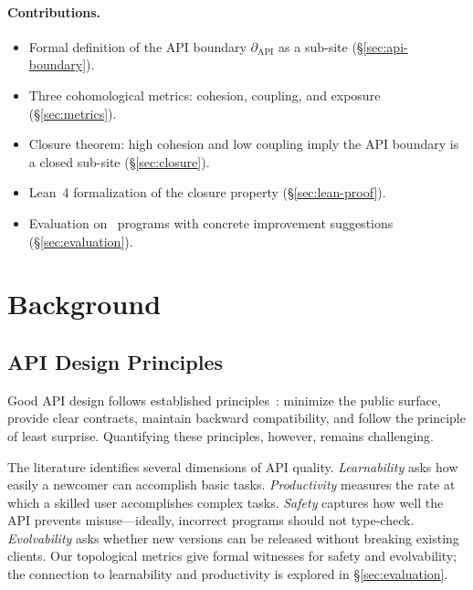 \documentclass[11pt]{article}
\newcommand{\APIBoundary}{\partial_{\mathrm{API}}}
\begin{document}
\paragraph{Contributions.}
\begin{itemize}[noitemsep]
  \item Formal definition of the API boundary $\APIBoundary$ as a sub-site
        (§\ref{sec:api-boundary}).
  \item Three cohomological metrics: cohesion, coupling, and exposure
        (§\ref{sec:metrics}).
  \item Closure theorem: high cohesion and low coupling imply the API
        boundary is a closed sub-site (§\ref{sec:closure}).
  \item Lean~4 formalization of the closure property
        (§\ref{sec:lean-proof}).
  \item Evaluation on \compTotalPrograms\ programs with concrete
        improvement suggestions (§\ref{sec:evaluation}).
\end{itemize}

\section{Background}\label{sec:background}

\subsection{API Design Principles}
Good API design follows established principles~\cite{Bloch2006}: minimize
the public surface, provide clear contracts, maintain backward
compatibility, and follow the principle of least surprise.  Quantifying
these principles, however, remains challenging.

The literature identifies several dimensions of API quality.  \emph{Learnability}
asks how easily a newcomer can accomplish basic tasks.  \emph{Productivity}
measures the rate at which a skilled user accomplishes complex tasks.
\emph{Safety} captures how well the API prevents misuse---ideally, incorrect
programs should not type-check.  \emph{Evolvability} asks whether new
versions can be released without breaking existing clients.  Our topological
metrics give formal witnesses for safety and evolvability; the connection
to learnability and productivity is explored in §\ref{sec:evaluation}.
\end{document}
